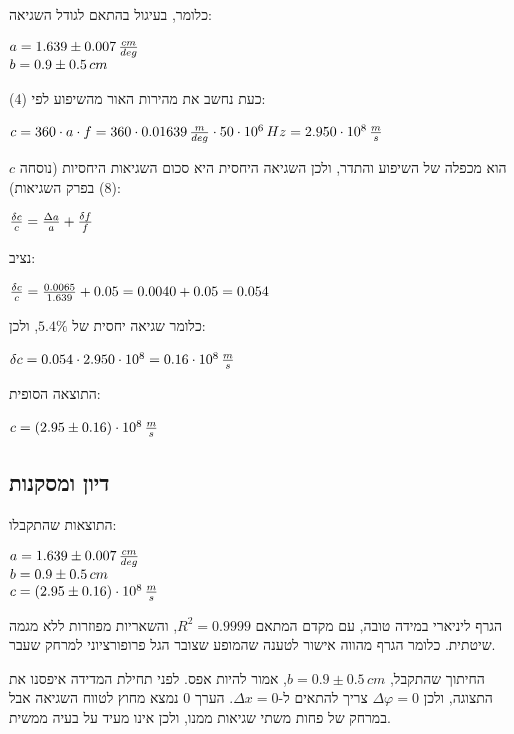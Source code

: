 \documentclass[14pt]{extarticle}
\makeatletter
\newenvironment{lefteqs}{%
    \begin{english}%
    \begin{flushleft}%
    \renewcommand{\arraystretch}{1.3}%
    $\begin{array}{@{}l@{}}%
}{%
    \end{array}$%
    \end{flushleft}%
    \end{english}%
}
\makeatother
\begin{document}
כלומר, בעיגול בהתאם לגודל השגיאה:
\begin{lefteqs}
    a = 1.639 \pm 0.007\,\frac{cm}{deg} \\
    b = 0.9 \pm 0.5\,cm
\end{lefteqs}

כעת נחשב את מהירות האור מהשיפוע לפי (4):
\begin{lefteqs}
    c = 360 \cdot a \cdot f = 360 \cdot 0.01639\,\frac{m}{deg} \cdot 50 \cdot 10^6\,Hz = 2.950 \cdot 10^8\,\frac{m}{s}
\end{lefteqs}

$c$ הוא מכפלה של השיפוע והתדר, ולכן השגיאה היחסית היא סכום השגיאות
היחסיות (נוסחה (8) בפרק השגיאות):
\begin{lefteqs}
    \frac{\delta c}{c} = \frac{\Delta a}{a} + \frac{\delta f}{f}
\end{lefteqs}
נציב:
\begin{lefteqs}
    \frac{\delta c}{c} = \frac{0.0065}{1.639} + 0.05 = 0.0040 + 0.05 = 0.054
\end{lefteqs}
כלומר שגיאה יחסית של $5.4\%$, ולכן:
\begin{lefteqs}
    \delta c = 0.054 \cdot 2.950 \cdot 10^8 = 0.16 \cdot 10^8\,\frac{m}{s}
\end{lefteqs}

התוצאה הסופית:
\begin{lefteqs}
    c = (2.95 \pm 0.16) \cdot 10^8\,\frac{m}{s}
\end{lefteqs}

\subsection*{דיון ומסקנות}

התוצאות שהתקבלו:
\begin{lefteqs}
    a = 1.639 \pm 0.007\,\frac{cm}{deg} \\
    b = 0.9 \pm 0.5\,cm \\
    c = (2.95 \pm 0.16) \cdot 10^8\,\frac{m}{s}
\end{lefteqs}

הגרף ליניארי במידה טובה, עם מקדם המתאם $R^2=0.9999$, והשאריות מפוזרות ללא מגמה שיטתית.
כלומר הגרף מהווה אישור לטענה שהמופע שצובר הגל פרופורציוני למרחק שעבר.

החיתוך שהתקבל, $b = 0.9 \pm 0.5\,cm$, אמור להיות אפס. לפני תחילת המדידה איפסנו את התצוגה,
ולכן $\Delta \varphi = 0$ צריך להתאים ל-$\Delta x = 0$. הערך 0 נמצא מחוץ לטווח השגיאה אבל במרחק
של פחות משתי שגיאות ממנו, ולכן אינו מעיד על בעיה ממשית. 
\end{document}
